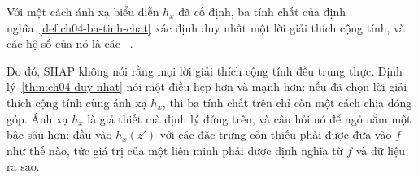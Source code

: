 \begin{theorem}
\label{thm:ch04-duy-nhat}
Với một cách ánh xạ biểu diễn $h_x$ đã cố định, ba tính chất của định
nghĩa~\ref{def:ch04-ba-tinh-chat} xác định duy nhất một lời giải thích cộng
tính, và các hệ số của nó là các
~\autocite{p10shap}.
\end{theorem}

Do đó, SHAP không nói rằng mọi lời giải thích cộng tính đều trung thực. Định
lý~\ref{thm:ch04-duy-nhat} nói một điều hẹp hơn và mạnh hơn: nếu đã chọn lời
giải thích cộng tính cùng ánh xạ $h_x$, thì ba tính chất trên chỉ còn một
cách chia đóng góp. Ánh xạ $h_x$ là giả thiết mà định lý đứng trên, và
câu hỏi nó để ngỏ nằm một bậc sâu hơn: đầu vào $h_x(z')$ với các đặc trưng
còn thiếu phải được đưa vào $f$ như thế nào, tức giá trị của một liên minh phải
được định nghĩa từ $f$ và dữ liệu ra sao.
